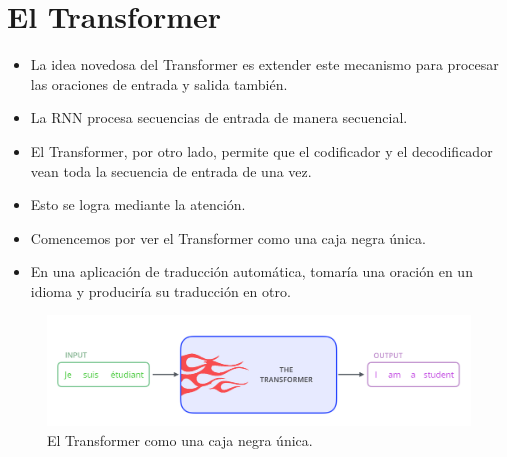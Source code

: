 \section{El Transformer}
\begin{itemize}
 \item La idea novedosa del Transformer es extender este mecanismo para procesar las oraciones de entrada y salida también.
 \item La RNN procesa secuencias de entrada de manera secuencial.
 \item El Transformer, por otro lado, permite que el codificador y el decodificador vean toda la secuencia de entrada de una vez.
 \item Esto se logra mediante la atención.
 \item Comencemos por ver el Transformer como una caja negra única.
 \item En una aplicación de traducción automática, tomaría una oración en un idioma y produciría su traducción en otro.
 \end{itemize}
\begin{figure}[h]
  \centering
  \includegraphics[scale=0.29]{pics/the_transformer_3.png}
  \caption{El Transformer como una caja negra única.}
\end{figure}

